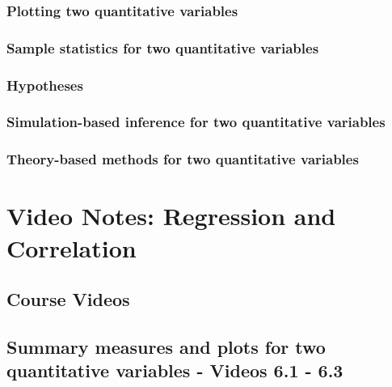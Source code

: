 \documentclass[
]{report}
\begin{document}
\subsubsection*{Plotting two quantitative variables}\label{plotting-two-quantitative-variables}

\subsubsection*{Sample statistics for two quantitative variables}\label{sample-statistics-for-two-quantitative-variables}

\subsubsection*{Hypotheses}\label{hypotheses-2}

\subsubsection*{Simulation-based inference for two quantitative variables}\label{simulation-based-inference-for-two-quantitative-variables}

\subsubsection*{Theory-based methods for two quantitative variables}\label{theory-based-methods-for-two-quantitative-variables}

\section{Video Notes: Regression and Correlation}\label{video-notes-regression-and-correlation}

\subsection{Course Videos}\label{course-videos-10}

\subsection*{Summary measures and plots for two quantitative variables - Videos 6.1 - 6.3}\label{summary-measures-and-plots-for-two-quantitative-variables---videos-6.1---6.3}
\end{document}
